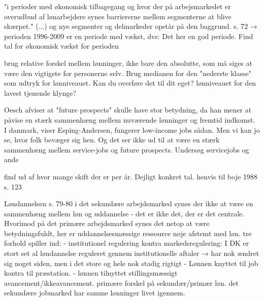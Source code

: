 "i perioder med økonomisk tilbagegang og hvor der på arbejsmarkedet er overudbud af lønarbejdere synes barriererne mellem segmenterne at blive skærpet." (...) og nye segmenter og delmarkeder opstår på den baggrund. s. 72
→ perioden 1996-2009 er en periode med vækst, dvs: Det her en god periode. Find tal for økonomisk vækst for perioden


brug relative forskel mellem lønninger, ikke bare den absolutte, som må siges at være den vigtigste for personerne selv. Brug medianen for den "nederste klasse" som udtryk for lønniveauet. Kan du overføre det til dit eget? lønniveauet for den lavest tjenende klynge?

Oesch afviser at "future prospects" skulle have stor betydning, da han mener at påvise en stærk sammenhæng mellem nuværende lønninger og fremtid indkomst. I danmark, viser Esping-Andersen, fungerer low-income jobs sådan. Men vi kan jo se, hvor folk bevæger sig hen. Og det ser ikke ud til at være en stærk sammenhæng mellem service-jobs og future prospects. Undersøg servicejobs og ande


find ud af hvor mange skift der er per år. Dejligt konkret tal. henvis til boje 1988 s. 123


Løndannelsen s. 79-80
	i det sekundære arbejdsmarked synes der ikke at være en sammenhæng mellem løn og uddannelse - det er ikke det, der er det centrale. Hvorimod på det primære arbejdsmarked synes det netop at være betydningsfuldt, her er uddannelsesmæssige ressource nøje afstemt med løn. 
	tre forhold spiller ind:
	- institutionel regulering kontra markedsregulering: I DK er stort set al løndannelse reguleret gennem institutionelle aftaler 
	→ har nok ændret sig noget siden, men i det store og hele nok stadig rigtigt
	- Lønnen knyttet til job kontra til præstation.
	- lønnen tilnyttet stillingsmæssigt avancement/ikkeavancement. primære forskel på sekundær/primær løn. det sekundære jobmarked har samme lønninger livet igennem. 






















